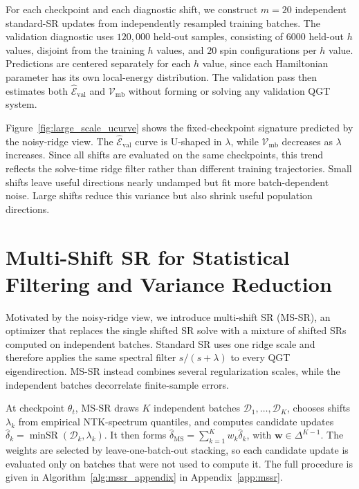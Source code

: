 \documentclass{article}
\DeclareMathOperator{\minSR}{minSR}
\begin{document}
For each checkpoint and each diagnostic shift, we construct $m=20$ independent
standard-SR updates from independently resampled training batches. The validation
diagnostic uses $120{,}000$ held-out samples, consisting of $6000$ held-out
$h$ values, disjoint from the training $h$ values, and $20$ spin configurations per
$h$ value. Predictions are centered separately for each $h$ value, since each
Hamiltonian parameter has its own local-energy distribution. The validation pass
then estimates both $\widehat{\mathcal E}_{\mathrm{val}}$ and
$\mathcal V_{\mathrm{mb}}$ without forming or solving any validation QGT system.

Figure~\ref{fig:large_scale_ucurve} shows the fixed-checkpoint signature
predicted by the noisy-ridge view. The
$\hat{\mathcal{E}}_{\mathrm{val}}$ curve is U-shaped in \(\lambda\), while
\(\mathcal V_{\mathrm{mb}}\) decreases as \(\lambda\) increases. Since all
shifts are evaluated on the same checkpoints, this trend reflects the
solve-time ridge filter rather than different training trajectories. Small
shifts leave useful directions nearly undamped but fit more batch-dependent
noise. Large shifts reduce this variance but also shrink useful population
directions.

\section{Multi-Shift SR for Statistical Filtering and Variance Reduction}
\label{sec:mssr}

Motivated by the noisy-ridge view, we introduce multi-shift SR (MS-SR), an
optimizer that replaces the single shifted SR solve with a mixture of shifted
SRs computed on independent batches. Standard SR uses one ridge scale
and therefore applies the same spectral filter \(s/(s+\lambda)\) to every QGT
eigendirection. MS-SR instead combines several regularization scales, while the
independent batches decorrelate finite-sample errors.

At checkpoint \(\theta_t\), MS-SR draws \(K\) independent batches
\(\mathcal D_1,\ldots,\mathcal D_K\), chooses shifts \(\lambda_k\) from
empirical NTK-spectrum quantiles, and computes candidate updates
\(\hat\delta_k=\minSR(\mathcal D_k,\lambda_k)\). It then forms
\(\hat\delta_{\mathrm{MS}}=\sum_{k=1}^K w_k\hat\delta_k\), with
\(\mathbf w\in\Delta^{K-1}\). The weights are selected by leave-one-batch-out
stacking, so each candidate update is evaluated only on batches that were not
used to compute it. The full procedure is given in
Algorithm~\ref{alg:mssr_appendix} in Appendix~\ref{app:mssr}.
\end{document}

